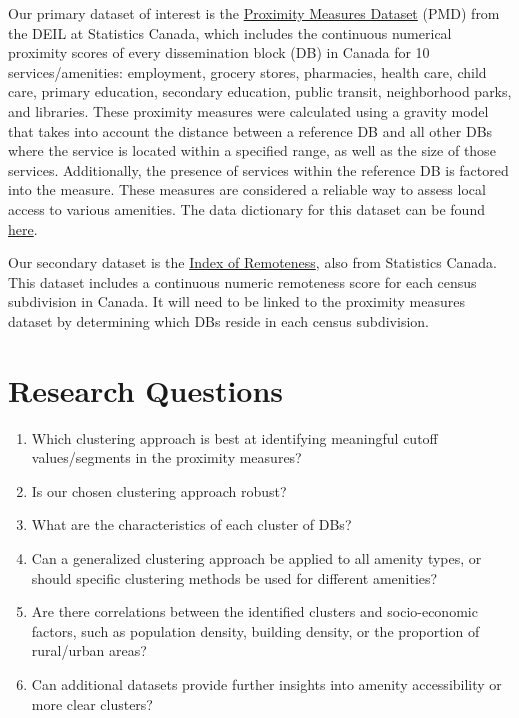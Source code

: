 \documentclass[11pt, a4paper]{article}
\begin{document}
Our primary dataset of interest is the \href{https://www150.statcan.gc.ca/n1/pub/17-26-0002/2020001/csv/pmd-eng.zip}{Proximity Measures Dataset} (PMD) from the DEIL at Statistics Canada, which includes the continuous numerical proximity scores of every dissemination block (DB) in Canada for 10 services/amenities: employment, grocery stores, pharmacies, health care, child care, primary education, secondary education, public transit, neighborhood parks, and libraries. These proximity measures were calculated using a gravity model that takes into account the distance between a reference DB and all other DBs where the service is located within a specified range, as well as the size of those services. Additionally, the presence of services within the reference DB is factored into the measure. These measures are considered a reliable way to assess local access to various amenities. The data dictionary for this dataset can be found \href{https://www150.statcan.gc.ca/n1/pub/71-607-x/71-607-x2020011-eng.htm}{here}. 
\par
Our secondary dataset is the \href{https://www150.statcan.gc.ca/n1/pub/17-26-0001/172600012020001-eng.htm}{Index of Remoteness}, also from Statistics Canada. This dataset includes a continuous numeric remoteness score for each census subdivision in Canada. It will need to be linked to the proximity measures dataset by determining which DBs reside in each census subdivision. 






\section*{Research Questions}

\begin{enumerate}
\item Which clustering approach is best at identifying meaningful cutoff values/segments in the proximity measures? 
\item Is our chosen clustering approach robust? 
\item What are the characteristics of each cluster of DBs? 
\item Can a generalized clustering approach be applied to all amenity types, or should specific clustering methods be used for different amenities? 
\item Are there correlations between the identified clusters and socio-economic factors, such as population density, building density, or the proportion of rural/urban areas? 
\item Can additional datasets provide further insights into amenity accessibility or more clear clusters? 
\end{enumerate}
\end{document}
